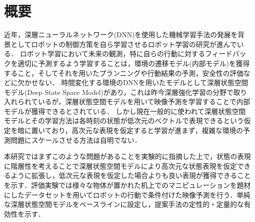 \chapter*{概要}
\label{chap:abstract}

近年，深層ニューラルネットワーク(DNN)を使用した機械学習手法の発展を背景としてロボットの制御方策を自ら学習させるロボット学習の研究が進んでいる．
ロボット学習において未来の観測，特に自らの行動に対するフィードバックを適切に予測するよう学習することは，環境の遷移モデル(内部モデル)を獲得すること，そしてそれを用いたプランニングや行動結果の予測，安全性の評価などに欠かせない．
時間変化する環境のDNNを用いたモデルとして深層状態空間モデル(Deep State Space Model)があり，これは昨今深層強化学習の分野で取り入れられているが，深層状態空間モデルを用いて映像予測を学習することで内部モデルが獲得できるとされている\cite{Gregor2015}．
しかし現在一般的に使われて深層状態空間モデルとその学習方法は各時刻の状態が低次元のベクトルで表現できるという仮定を暗に置いており，高次元な表現を仮定すると学習が進まず，複雑な環境の予測問題にスケールさせる方法は自明でない．

本研究ではまずこのような問題があることを実験的に指摘した上で，状態の表現に階層性を考えることで深層状態空間モデルにより高次元な状態表現を仮定できるように拡張し，低次元な表現を仮定した場合よりも良い表現が獲得できることを示す．評価実験では様々な物体が置かれた机上でのマニピュレーションを題材にしたデータセットを用いてロボットの行動で条件付けた映像予測を行う．単純な深層状態空間モデルをベースラインに設定し，提案手法の定性的・定量的な有効性を示す．